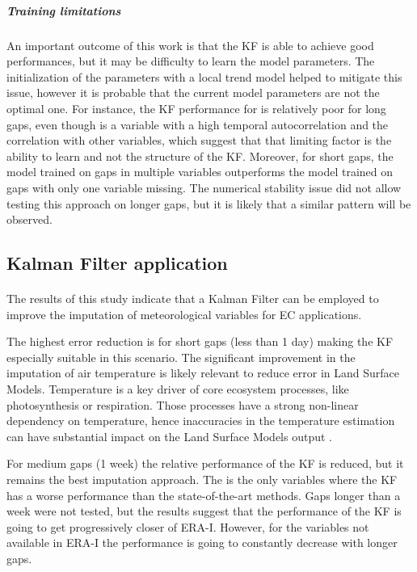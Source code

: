\documentclass{article}
\let\Oldsubsection\subsection
\renewcommand{\subsection}{\FloatBarrier\Oldsubsection}
\begin{document}
\subparagraph{Training limitations} An important outcome of this work is that the KF is able to achieve good performances, but it may be difficulty to learn the  model parameters. The initialization of the parameters with a local trend model helped to mitigate this issue, however it is probable that the current model parameters are not the optimal one. For instance, the KF performance for  is relatively poor for long gaps, even though is a variable with a high temporal autocorrelation and the correlation with other variables, which suggest that that limiting factor is the ability to learn and not the structure of the KF. Moreover, for short gaps, the model trained on gaps in multiple variables outperforms the model trained on gaps with only one variable missing. The numerical stability issue did not allow testing this approach on longer gaps, but it is likely that a similar pattern will be observed.


\subsection{Kalman Filter application}

\paragraph{} The results of this study indicate that a Kalman Filter can be employed to improve the imputation of meteorological variables for EC applications.

The highest error reduction is for short gaps (less than 1 day) making the KF especially suitable in this scenario. The significant improvement in the imputation of air temperature is likely relevant to reduce error in Land Surface Models. Temperature is a key driver of core ecosystem processes, like photosynthesis or respiration. Those processes have a strong non-linear dependency on temperature, hence inaccuracies in the temperature estimation can have substantial impact on the Land Surface Models output  \cite{bonan_climate_2019-2}.

For medium gaps (1 week) the relative performance of the KF is reduced, but it remains the best imputation approach. The  is the only variables where the KF has a worse performance than the state-of-the-art methods.
Gaps longer than a week were not tested, but the results suggest that the performance of the KF is going to get progressively closer of ERA-I. However, for the variables not available in ERA-I the performance is going to constantly decrease with longer gaps.
\end{document}
